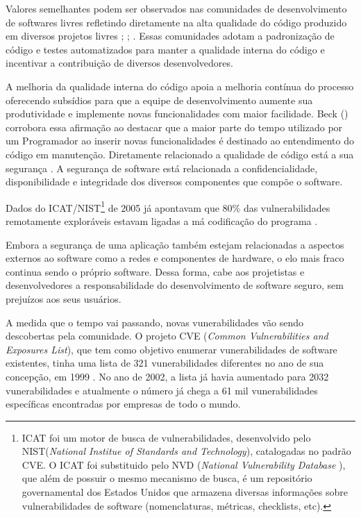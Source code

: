 Valores semelhantes podem ser observados nas comunidades de desenvolvimento de softwares livres refletindo diretamente na alta qualidade do código produzido em diversos projetos livres \cite{schmidt2001}; \cite{halloran2002}; \cite{michlmayr2003}.
%
Essas comunidades adotam a padronização de código e testes automatizados para manter a qualidade interna do código e incentivar a contribuição de diversos desenvolvedores.

A melhoria da qualidade interna do código apoia a melhoria contínua do processo oferecendo subsídios para que a equipe de desenvolvimento aumente sua produtividade e implemente novas funcionalidades com maior facilidade. Beck (\citeyear{beck2007}) corrobora essa afirmação ao destacar que a maior parte do tempo utilizado por um Programador ao inserir novas funcionalidades é destinado ao entendimento do código em manutenção. 
%
Diretamente relacionado a qualidade de código está a sua segurança \cite{tsipenyuk2005}. A segurança de software está relacionada a confidencialidade, disponibilidade e integridade dos diversos componentes que compõe o software.

Dados do ICAT/NIST\footnote{ ICAT foi um motor de busca de vulnerabilidades, desenvolvido pelo NIST(\emph{National Institue of Standards and Technology}), catalogadas no padrão CVE. O ICAT foi substituido pelo NVD (\emph{National Vulnerability Database }), que além de possuir o mesmo mecanismo de busca, é um repositório governamental dos Estados Unidos que armazena diversas informações sobre vulnerabilidades de software (nomenclaturas, métricas, checklists, etc).} de 2005 já apontavam que 80\% das vulnerabilidades remotamente exploráveis estavam ligadas a má codificação do programa \cite{duarte2005}.

%

Embora a segurança de uma aplicação também estejam relacionadas a aspectos externos ao software como a redes e componentes de hardware, o elo mais fraco continua sendo o próprio software. Dessa forma, cabe aos projetistas e desenvolvedores a responsabilidade do desenvolvimento de software seguro, sem prejuízos aos seus usuários.

%

A medida que o tempo vai passando, novas vunerabilidades vão sendo descobertas pela comunidade. O projeto CVE (\emph{Common Vulnerabilities and Exposures List}), que tem como objetivo enumerar vunerabilidades de software existentes, tinha uma lista de 321 vunerabilidades diferentes no ano de sua concepção, em 1999 \cite{cve2002}.
%
No ano de 2002, a lista já havia aumentado para 2032 vunerabilidades e atualmente o número já chega a 61 mil vunerabilidades específicas encontradas por empresas de todo o mundo.


